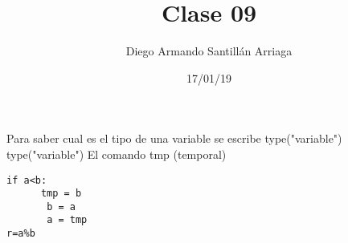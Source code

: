 \documentclass[letterpaper, 12pt, oneside]{article}%
\title{\Huge Clase 09}
\author{Diego Armando Santillán Arriaga}
\date{17/01/19}
\begin{document}
	\maketitle
	\newpage
Para saber cual es el tipo de una variable se escribe type("variable")
type("variable")
El comando tmp (temporal) 

\begin{verbatim}
if a<b:
      tmp = b
       b = a
       a = tmp
r=a%b       
\end{verbatim}
\end{document}
